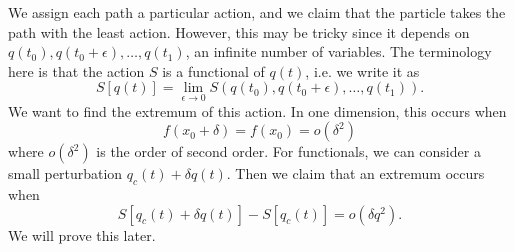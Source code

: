 \documentclass{article}
\numberwithin{equation}{section}
\begin{document}
We assign each path a particular action, and we claim that the particle takes the path with the least action. However, this may be tricky since it depends on $q(t_0),q(t_0+\epsilon),\dots,q(t_1)$, an infinite number of variables. The terminology here is that the action $S$ is a functional of $q(t)$, i.e. we write it as
\begin{equation}
    S[q(t)] = \lim_{\epsilon \to 0} S(q(t_0), q(t_0+\epsilon), \dots, q(t_1)).
\end{equation}
We want to find the extremum of this action. In one dimension, this occurs when
\begin{equation}
    f(x_0+\delta)=f(x_0)=o(\delta^2)
\end{equation}
where $o(\delta^2)$ is the order of second order. For functionals, we can consider a small perturbation $q_c(t) + \delta q(t)$. Then we claim that an extremum occurs when
\begin{equation}
    S[q_c(t)+\delta q(t)] - S[q_c(t)] = o(\delta q^2).
\end{equation}
We will prove this later.
\end{document}
